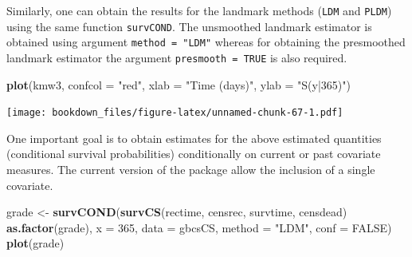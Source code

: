 \documentclass[]{book}
\makeatletter
\newenvironment{Shaded}{\begin{snugshade}}{\end{snugshade}}
\newcommand{\KeywordTok}[1]{\textcolor[rgb]{0.13,0.29,0.53}{\textbf{#1}}}
\newcommand{\DataTypeTok}[1]{\textcolor[rgb]{0.13,0.29,0.53}{#1}}
\newcommand{\DecValTok}[1]{\textcolor[rgb]{0.00,0.00,0.81}{#1}}
\newcommand{\StringTok}[1]{\textcolor[rgb]{0.31,0.60,0.02}{#1}}
\newcommand{\CommentTok}[1]{\textcolor[rgb]{0.56,0.35,0.01}{\textit{#1}}}
\newcommand{\OtherTok}[1]{\textcolor[rgb]{0.56,0.35,0.01}{#1}}
\newcommand{\OperatorTok}[1]{\textcolor[rgb]{0.81,0.36,0.00}{\textbf{#1}}}
\newcommand{\NormalTok}[1]{#1}
\newenvironment{kframe}{%
\medskip{}
\setlength{\fboxsep}{.8em}
 \def\at@end@of@kframe{}%
 \ifinner\ifhmode%
  \def\at@end@of@kframe{\end{minipage}}%
  \begin{minipage}{\columnwidth}%
 \fi\fi%
 \def\FrameCommand##1{\hskip\@totalleftmargin \hskip-\fboxsep
 \colorbox{shadecolor}{##1}\hskip-\fboxsep
     \hskip-\linewidth \hskip-\@totalleftmargin \hskip\columnwidth}%
 \MakeFramed {\advance\hsize-\width
   \@totalleftmargin\z@ \linewidth\hsize
   \@setminipage}}%
 {\par\unskip\endMakeFramed%
 \at@end@of@kframe}
\renewenvironment{Shaded}{\begin{kframe}}{\end{kframe}}
\theoremstyle{definition}
\theoremstyle{definition}
\theoremstyle{definition}
\theoremstyle{remark}
\makeatother
\begin{document}
\begin{Shaded}
\end{Shaded}

Similarly, one can obtain the results for the landmark methods
(\texttt{LDM} and \texttt{PLDM}) using the same function
\texttt{survCOND}. The unsmoothed landmark estimator is obtained using
argument \texttt{method\ =\ "LDM"} whereas for obtaining the presmoothed
landmark estimator the argument \texttt{presmooth\ =\ TRUE} is also
required.

\begin{Shaded}
\begin{Highlighting}[]
\KeywordTok{plot}\NormalTok{(kmw3, }\DataTypeTok{confcol =} \StringTok{"red"}\NormalTok{, }\DataTypeTok{xlab =} \StringTok{"Time (days)"}\NormalTok{, }\DataTypeTok{ylab =} \StringTok{"S(y|365)"}\NormalTok{)}
\end{Highlighting}
\end{Shaded}

\texttt{[image: bookdown\_files/figure-latex/unnamed-chunk-67-1.pdf]}

One important goal is to obtain estimates for the above estimated
quantities (conditional survival probabilities) conditionally on current
or past covariate measures. The current version of the package allow the
inclusion of a single covariate.

\begin{Shaded}
\begin{Highlighting}[]
\NormalTok{grade <-}\StringTok{ }\KeywordTok{survCOND}\NormalTok{(}\KeywordTok{survCS}\NormalTok{(rectime, censrec, survtime, censdead) }\OperatorTok{~}\StringTok{ }\KeywordTok{as.factor}\NormalTok{(grade),}
                  \DataTypeTok{x =} \DecValTok{365}\NormalTok{, }\DataTypeTok{data =}\NormalTok{ gbcsCS, }\DataTypeTok{method =} \StringTok{"LDM"}\NormalTok{, }\DataTypeTok{conf =} \OtherTok{FALSE}\NormalTok{)}
\KeywordTok{plot}\NormalTok{(grade)}
\end{Highlighting}
\end{Shaded}
\end{document}
